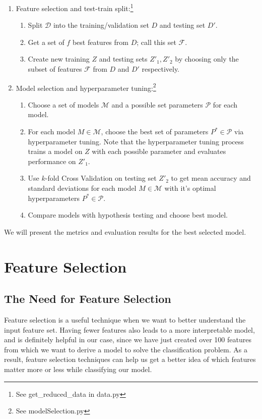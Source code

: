 \documentclass[fleqn]{article}
\begin{document}
    \begin{enumerate}
        \item Feature selection and test-train split:\footnote{See get\_reduced\_data in data.py}
        \begin{enumerate}[label=\roman*.]
            \item Split $ \mathcal{D} $ into the training/validation set $ D $ and testing
            set $ D' $.
            \item Get a set of $ f $ best features from $ D $; call this set $ \mathcal{F} $.
            \item Create new training $ Z $ and testing sets $ Z'_1, Z'_2 $ by
            choosing only the subset of features $ \mathcal{F} $ from $ D $ and $D'$ respectively.
        \end{enumerate}
        \item Model selection and hyperparameter tuning:\footnote{See modelSelection.py}
        \begin{enumerate}[label=\roman*.]
            \item Choose a set of models $ \mathcal{M} $ and a possible set parameters
            $ \mathcal{P} $ for each model.
            \item For each model $ M \in \mathcal{M} $, choose the best set of parameters
            $ P^* \in\mathcal{P} $ via hyperparameter tuning. Note that the hyperparameter
            tuning process trains a model on $ Z $ with each possible parameter and evaluates
            performance on $ Z'_1 $.
            \item Use $k$-fold Cross Validation on testing set $ Z'_2 $ to get mean accuracy
            and standard deviations for each model $ M \in \mathcal{M} $ with it's
            optimal hyperparameters $ P^* \in\mathcal{P} $.
            \item Compare models with hypothesis testing and choose best model.
        \end{enumerate}
    \end{enumerate}

    We will present the metrics and evaluation results for the best selected model.

    \section{Feature Selection}

    \subsection{The Need for Feature Selection}
    Feature selection is a useful technique when we want to better understand the input
    feature set. Having fewer features also leads to a more interpretable model, and is
    definitely helpful in our case, since we have just created over 100 features from
    which we want to derive a model to solve the classification problem. As a result,
    feature selection techniques can help us get a better idea of which features matter
    more or less while classifying our model.\\
\end{document}
